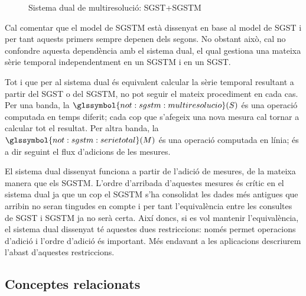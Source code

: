 \begin{figure}
  \centering
  
  \caption{Sistema dual de multiresolució: \gls{SGST}+\gls{SGSTM}}
  \label{fig:multiresolucio:dual}
\end{figure}


Cal comentar que el model de \gls{SGSTM} està dissenyat en base al
model de \gls{SGST} i per tant aquests primers sempre depenen dels
segons. No obstant això, cal no confondre aquesta dependència amb el
sistema dual, el qual gestiona una mateixa sèrie temporal independentment
en un \gls{SGSTM} i en un \gls{SGST}.




Tot i que per al sistema dual és equivalent calcular la sèrie temporal
resultant a partir del \gls{SGST} o del \gls{SGSTM}, no pot seguir el
mateix procediment en cada cas. Per una banda, la
$\glssymbol{not:sgstm:multiresolucio}(S)$ és una operació computada en
temps diferit; cada cop que s'afegeix una nova mesura cal tornar a
calcular tot el resultat. Per altra banda, la
$\glssymbol{not:sgstm:serietotal}(M)$ és una operació computada en
línia; és a dir seguint el flux d'adicions de les mesures.


El sistema dual dissenyat funciona a partir de l'adició de mesures, de
la mateixa manera que els \gls{SGSTM}. L'ordre d'arribada d'aquestes
mesures és crític en el sistema dual ja que un cop el \gls{SGSTM} s'ha
consolidat les dades més antigues que arribin no seran tingudes en
compte i per tant l'equivalència entre les consultes de \gls{SGST} i
\gls{SGSTM} ja no serà certa. Així doncs, si es vol mantenir
l'equivalència, el sistema dual dissenyat té aquestes dues
restriccions: només permet operacions d'adició i l'ordre d'adició és
important.  Més endavant a les aplicacions descriurem l'abast
d'aquestes restriccions.







\subsection{Conceptes relacionats}


